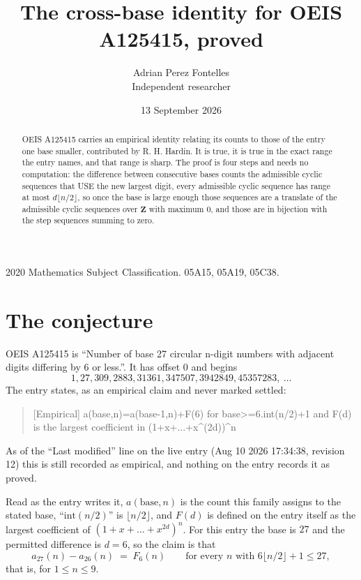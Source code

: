 \documentclass[11pt,a4paper]{article}
\title{The cross-base identity for OEIS A125415, proved}
\author{Adrian Perez Fontelles\\ \small Independent researcher}
\date{13 September 2026}
\theoremstyle{plain}
\theoremstyle{definition}
\begin{document}
\maketitle

\begin{abstract}
OEIS A125415 carries an empirical identity relating its counts to those of the entry one base
smaller, contributed by R. H. Hardin. It is true, it is true in the exact range the entry
names, and that range is sharp. The proof is four steps and needs no computation: the
difference between consecutive bases counts the admissible cyclic sequences that USE the new
largest digit, every admissible cyclic sequence has range at most $d\lfloor n/2\rfloor$, so
once the base is large enough those sequences are a translate of the admissible cyclic
sequences over $\mathbf{Z}$ with maximum $0$, and those are in bijection with the step
sequences summing to zero.
\end{abstract}

\noindent\small 2020 Mathematics Subject Classification. 05A15, 05A19, 05C38.\normalsize

\section{The conjecture}

OEIS A125415 is ``Number of base 27 circular n-digit numbers with adjacent digits differing by 6 or less.''. It has offset $0$ and begins
\[
1, 27, 309, 2883, 31361, 347507, 3942849, 45357283,\ \dots
\]
The entry states, as an empirical claim and never marked settled:
\begin{quote}
[Empirical] a(base,n)=a(base-1,n)+F(6) for base>=6.int(n/2)+1 and F(d) is the largest coefficient in (1+x+...+x\textasciicircum{}(2d))\textasciicircum{}n
\end{quote}
As of the ``Last modified'' line on the live entry (Aug 10 2026 17:34:38, revision 12)
this is still recorded as empirical, and nothing on the entry records it as proved.

Read as the entry writes it, $a(\mathrm{base},n)$ is the count this family assigns to the
stated base, ``$\mathrm{int}(n/2)$'' is $\lfloor n/2\rfloor$, and $F(d)$ is defined on the
entry itself as the largest coefficient of $(1+x+\dots+x^{2d})^{n}$. For this entry
the base is $27$ and the permitted difference is $d=6$, so the claim is that
\[
a_{27}(n)-a_{26}(n)\;=\;F_{6}(n)
\qquad\text{for every } n \text{ with } 6\lfloor n/2\rfloor+1\le27,
\]
that is, for $1\le n\le9$.
\end{document}

